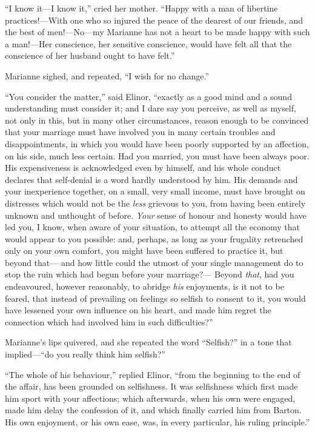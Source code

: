 ``I know it---I know it,'' cried her mother.
``Happy with a man of libertine practices!---With one
who so injured the peace of the dearest of our friends,
and the best of men!---No---my Marianne has not a heart
to be made happy with such a man!---Her conscience, her
sensitive conscience, would have felt all that the
conscience of her husband ought to have felt.''

Marianne sighed, and repeated, ``I wish for no change.''

``You consider the matter,'' said Elinor, ``exactly as
a good mind and a sound understanding must consider it;
and I dare say you perceive, as well as myself, not only
in this, but in many other circumstances, reason enough
to be convinced that your marriage must have involved you
in many certain troubles and disappointments, in which
you would have been poorly supported by an affection,
on his side, much less certain.  Had you married,
you must have been always poor.  His expensiveness is
acknowledged even by himself, and his whole conduct declares
that self-denial is a word hardly understood by him.
His demands and your inexperience together, on a small,
very small income, must have brought on distresses which
would not be the \emph{less} grievous to you, from having been
entirely unknown and unthought of before.  \emph{Your} sense
of honour and honesty would have led you, I know,
when aware of your situation, to attempt all the economy
that would appear to you possible: and, perhaps, as long
as your frugality retrenched only on your own comfort,
you might have been suffered to practice it, but beyond that---%
and how little could the utmost of your single management
do to stop the ruin which had begun before your marriage?---%
Beyond \emph{that}, had you endeavoured, however reasonably,
to abridge \emph{his} enjoyments, is it not to be feared, that instead
of prevailing on feelings so selfish to consent to it,
you would have lessened your own influence on his heart,
and made him regret the connection which had involved him
in such difficulties?''

Marianne's lips quivered, and she repeated the word
``Selfish?'' in a tone that implied---``do you really think
him selfish?''

``The whole of his behaviour,'' replied Elinor,
``from the beginning to the end of the affair, has been
grounded on selfishness.  It was selfishness which first
made him sport with your affections; which afterwards,
when his own were engaged, made him delay the confession
of it, and which finally carried him from Barton.
His own enjoyment, or his own ease, was, in every particular,
his ruling principle.''

